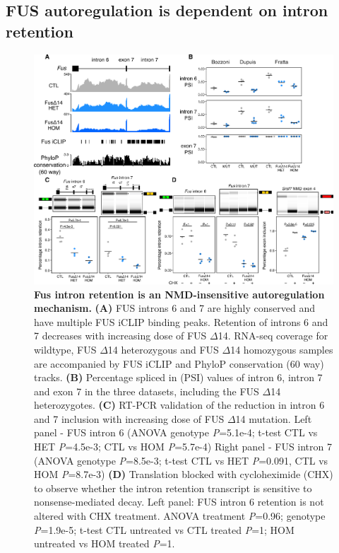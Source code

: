 \subsection{FUS autoregulation is dependent on intron retention}

\begin{figure}[h!]
	\centering
	\includegraphics[width=\textwidth]{Figures/06_fus_meta/Fus_autoregulation.png}
	\caption[FUS intron retention is an NMD-insensitive autoregulation mechanism]{
		\textbf{Fus intron retention is an NMD-insensitive autoregulation mechanism.}
	\textbf{(A)} FUS introns 6 and 7 are highly conserved and have multiple FUS iCLIP binding peaks. 
	Retention of introns 6 and 7 decreases with increasing dose of FUS $\Delta$14. 
	RNA-seq coverage for wildtype, FUS $\Delta$14 heterozygous and FUS $\Delta$14 homozygous samples are accompanied by FUS iCLIP \citep{Rogelj2012} and PhyloP conservation (60 way) tracks.
	\textbf{(B)} Percentage spliced in (PSI) values of intron 6, intron 7 and exon 7 in the three datasets, including the FUS $\Delta$14 heterozygotes.
	\textbf{(C)} RT-PCR validation of the reduction in intron 6 and 7 inclusion with increasing dose of FUS $\Delta$14 mutation. 
	Left panel - FUS intron 6 (ANOVA genotype \textit{P}=5.1e-4; t-test CTL vs HET \textit{P}=4.5e-3; CTL vs HOM \textit{P}=5.7e-4)
	Right panel - FUS intron 7 (ANOVA genotype \textit{P}=8.5e-3; t-test CTL vs HET \textit{P}=0.091, CTL vs HOM \textit{P}=8.7e-3)
	\textbf{(D)}	Translation blocked with cycloheximide (CHX) to observe whether the intron retention transcript is sensitive to nonsense-mediated decay. 
	Left panel: FUS intron 6 retention is not altered with CHX treatment. ANOVA treatment \textit{P}=0.96; genotype \textit{P}=1.9e-5; t-test CTL untreated vs CTL treated \textit{P}=1; HOM untreated vs HOM treated \textit{P}=1.
}
\end{figure}
